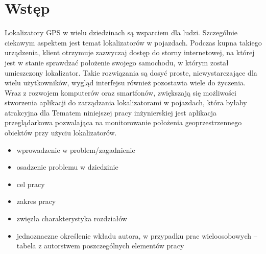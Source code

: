 \chapter{Wstęp}
\label{ch:wstep}

Lokalizatory GPS w wielu dziedzinach są wsparciem dla ludzi. Szczególnie ciekawym aspektem jest temat lokalizatorów w pojazdach. Podczas kupna takiego urządzenia, klient otrzymuje zazwyczaj dostęp do storny internetowej, na której jest w stanie sprawdzać położenie swojego samochodu, w którym został umieszczony lokalizator. Takie rozwiązania są dosyć proste, niewystarczające dla wielu użytkowników, wygląd interfejsu również pozostawia wiele do życzenia. Wraz z rozwojem komputerów oraz smartfonów, zwiększają się możliwości stworzenia aplikacji do zarządzania lokalizatorami w pojazdach, która byłaby atrakcyjna dla 
Tematem niniejszej pracy inżynierskiej jest aplikacja przeglądarkowa pozwalająca na monitorowanie położenia geoprzestrzennego obiektów przy użyciu lokalizatorów. 

\begin{itemize}
\item wprowadzenie w problem/zagadnienie
\item osadzenie problemu w dziedzinie
\item cel pracy
\item zakres pracy
\item zwięzła charakterystyka rozdziałów
\item jednoznaczne określenie wkładu autora, w przypadku prac wieloosobowych – tabela z autorstwem poszczególnych elementów pracy
\end{itemize}

